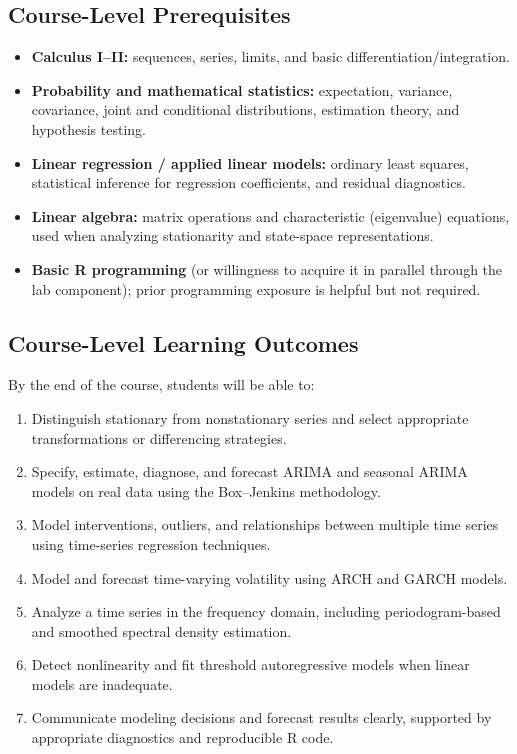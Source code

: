 \documentclass[11pt]{article}
\begin{document}
\subsection{Course-Level Prerequisites}
\begin{itemize}
  \item \textbf{Calculus I--II:} sequences, series, limits, and basic differentiation/integration.
  \item \textbf{Probability and mathematical statistics:} expectation, variance, covariance, joint and conditional distributions, estimation theory, and hypothesis testing.
  \item \textbf{Linear regression / applied linear models:} ordinary least squares, statistical inference for regression coefficients, and residual diagnostics.
  \item \textbf{Linear algebra:} matrix operations and characteristic (eigenvalue) equations, used when analyzing stationarity and state-space representations.
  \item \textbf{Basic R programming} (or willingness to acquire it in parallel through the lab component); prior programming exposure is helpful but not required.
\end{itemize}

\subsection{Course-Level Learning Outcomes}
By the end of the course, students will be able to:
\begin{enumerate}[itemsep=3pt]
  \item Distinguish stationary from nonstationary series and select appropriate transformations or differencing strategies.
  \item Specify, estimate, diagnose, and forecast ARIMA and seasonal ARIMA models on real data using the Box--Jenkins methodology.
  \item Model interventions, outliers, and relationships between multiple time series using time-series regression techniques.
  \item Model and forecast time-varying volatility using ARCH and GARCH models.
  \item Analyze a time series in the frequency domain, including periodogram-based and smoothed spectral density estimation.
  \item Detect nonlinearity and fit threshold autoregressive models when linear models are inadequate.
  \item Communicate modeling decisions and forecast results clearly, supported by appropriate diagnostics and reproducible R code.
\end{enumerate}
\end{document}
